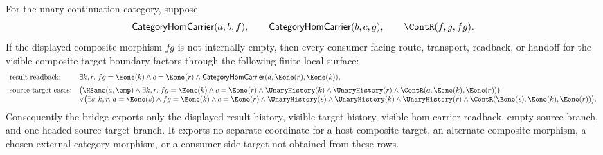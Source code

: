 \begin{theorem}
\label{thm:category-visible-composite-target-bridge-determinacy}
For the unary-continuation category, suppose
$$
\mathsf{CategoryHomCarrier}(a,b,f),\qquad
\mathsf{CategoryHomCarrier}(b,c,g),\qquad
\ContR(f,g,fg).
$$
If the displayed composite morphism $fg$ is not internally empty, then every
consumer-facing route, transport, readback, or handoff for the visible
composite target boundary factors through the following finite local surface:
$$
\begin{array}{ll}
\text{result readback:} &
\exists k,r.\;fg=\Eone(k)\land c=\Eone(r)\land
\mathsf{CategoryHomCarrier}(a,\Eone(r),\Eone(k)),
\\[2mm]
\text{source-target cases:} &
\bigl(\HSame(a,\emp)\land
\exists k,r.\;fg=\Eone(k)\land c=\Eone(r)\land
\UnaryHistory(k)\land\UnaryHistory(r)\land
\ContR(a,\Eone(k),\Eone(r))\bigr)
\\
&\vee
\bigl(\exists s,k,r.\;a=\Eone(s)\land fg=\Eone(k)\land c=\Eone(r)\land
\UnaryHistory(s)\land\UnaryHistory(k)\land\UnaryHistory(r)\land
\ContR(\Eone(s),\Eone(k),\Eone(r))\bigr).
\end{array}
$$
Consequently the bridge exports only the displayed result history, visible
target history, visible hom-carrier readback, empty-source branch, and
one-headed source-target branch. It exports no separate coordinate for a host
composite target, an alternate composite morphism, a chosen external category
morphism, or a consumer-side target not obtained from these rows.
\end{theorem}
